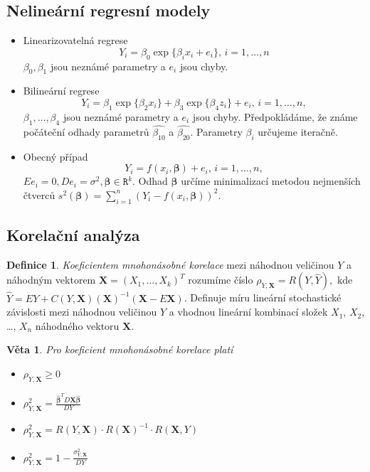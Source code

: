\documentclass[a4]{report}
\newtheorem{theorem}{Věta}
\theoremstyle{definition}
\newtheorem{definition}{Definice}[section]
\begin{document}
{\subsection{Nelineární regresní modely}
\begin{itemize}
\item Linearizovatelná regrese $$Y_i = \beta_0 \exp \{\beta_i x_i + e_i \},\, i=1,\ldots, n$$ $\beta_0, \beta_1$ jsou neznámé parametry a $e_i$ jsou chyby.
\item Bilineární regrese $$Y_i = \beta_1 \exp \{\beta_2 x_i \} + \beta_3 \exp \{\beta_4 z_i \}+ e_i,\,i=1,\ldots, n,$$ $\beta_1, \ldots, \beta_4$ jsou neznámé parametry a $e_i$ jsou chyby. Předpokládáme, že známe počáteční odhady parametrů $\hat{\beta_{10}}$ a $\hat{\beta_{20}}$. Parametry $\beta_i$ určujeme iteračně.
\item Obecný případ $$Y_i = f\left(x_i,\pmb{\beta} \right) + e_i,\,i=1,\ldots, n, $$ $E e_i = 0, D e_i = \sigma^2, \pmb{\beta} \in \mathtt{R}^k.$ Odhad $\pmb{\beta}$ určíme minimalizací metodou nejmenších čtverců $ s^2 \left(\pmb{\beta} \right) = \sum_{i=1}^{n} \left( Y_i - f \left(x_i,\pmb{\beta} \right) \right)^2.$
\end{itemize}

\subsection{Korelační analýza}
\begin{definition}
\textit{Koeficientem mnohonásobné korelace} mezi náhodnou veličinou $Y$ a náhodným vektorem $\pmb{X} = \left(X_1,\ldots, X_k \right)^T$ rozumíme číslo $\rho_{Y,\pmb{X}} = R \left( Y, \hat{Y} \right),$ kde $\hat{Y} = E Y + C \left(Y, \pmb{X} \right) \left(\pmb{X}\right)^{-1}\left(\pmb{X}- E \pmb{X} \right)$. Definuje míru lineární stochastické závislosti mezi náhodnou veličinou $Y$ a vhodnou lineární kombinací složek $X_1$, $X_2$, \ldots, $X_n$ náhodného vektoru $\mathbf{X}$.
\end{definition}

\begin{theorem}
Pro koeficient mnohonásobné korelace platí
\begin{itemize}
\item $\rho_{Y, \mathbf{X}} \geq 0$
\item $\rho_{Y, \mathbf{X}}^2 = \frac{\bm{\hat{\beta}}^T D \mathbf{X} \bm{\hat{\beta}}}{D Y}$
\item $\rho_{Y, \mathbf{X}}^2 = R(Y, \mathbf{X}) \cdot R(\mathbf{X})^{-1} \cdot R(\mathbf{X}, Y)$
\item $\rho_{Y, \mathbf{X}}^2 = 1 - \frac{\sigma_{Y, \mathbf{X}}^2}{D Y}$
\end{itemize}
\end{theorem}

}
\end{document}
